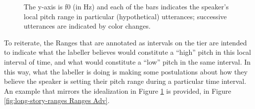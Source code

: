 \documentclass[11pt, twoside]{memoir}
\begin{document}
\begin{figure}[H]
\centering
%
%
\caption[An idealization of pitch ranges in four hypothetical utterances.]{The y-axis is f0 (in Hz) and each of the bars indicates the speaker’s local pitch range in particular (hypothetical) utterances; successive utterances are indicated by color changes.%
\label{fig:Ranges bars}%
}
\end{figure}


To reiterate, the Ranges that are annotated as intervals on the tier are intended to indicate what the labeller believes would constitute a “high” pitch in this local interval of time, and what would constitute a “low” pitch in the same interval. In this way, what the labeller is doing is making some postulations about how they believe the speaker is setting their pitch range during a particular time interval. An example that mirrors the idealization in Figure \ref{fig:Ranges bars} is provided, in Figure \ref{fig:long-story-ranges Ranges Adv}.
\end{document}
